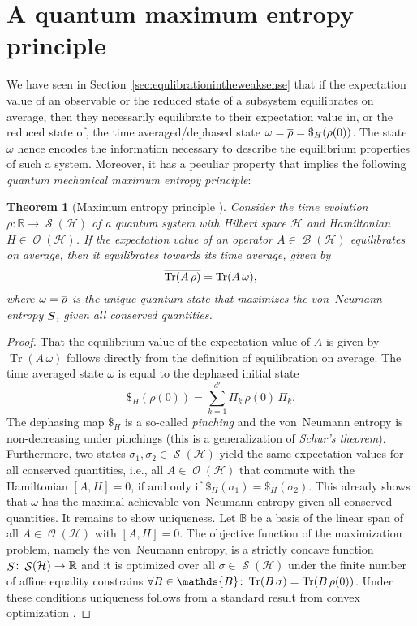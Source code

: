 \documentclass[a4paper,12pt,listof=totoc,index=totoc,bibliography=totoc,headsepline=false,headings=normal,BCOR16.153846mm,DIV12,headinclude,twoside,cleardoublepage=empty,numbers=noenddot,final]{scrreprt}
\theoremstyle{mystyle}
\numberwithin{equation}{section}
\numberwithin{figure}{section}
\numberwithin{lemma}{section}
\newtheorem{theorem}{Theorem}
\numberwithin{theorem}{section}
\numberwithin{corollary}{section}
\numberwithin{definition}{section}
\numberwithin{conjecture}{section}
\numberwithin{observation}{section}
\newcommand{\+}{\mkern2mu}
\newcommand{\oftype}{\colon}
\newcommand{\itholds}{\colon\mathchoice{\quad}{}{}{}}
\renewcommand{\H}{H}
\newcommand{\Basis}{\mathds{B}}
\newcommand{\taverage}[2][]{
  \ifthenelse{\equal{#1}{}}
  {\overline{#2}}
  {\overline{#2}^{#1}}
}
\DeclareMathOperator{\1}{\mathds{1}}
\DeclareMathOperator{\Bop}{\mathcal{B}}
\DeclareMathOperator{\Obs}{\mathcal{O}}
\DeclareMathOperator{\Qst}{\mathcal{S}}
\DeclareMathOperator{\Svn}{\mathnormal{S}}
\DeclareMathOperator{\Tr}{Tr}
\newcommand{\mc}[1]{\mathcal{#1}}
\newcommand{\mcH}{\mc{H}}
\newcommand{\mb}[1]{\mathbb{#1}}
\newcommand{\R}{\mb{R}}
\begin{document}
\section{A quantum maximum entropy principle}
\label{sec:aquantummaximumentropyprinciple}
%
We have seen in Section~\ref{sec:equlibrationintheweaksense} that if the expectation value of an observable or the reduced state of a subsystem equilibrates on average, then they necessarily equilibrate to their expectation value in, or the reduced state of, the time averaged/dephased state $\omega = \taverage{\rho} = \$_\H(\rho(0))$.
The state $\omega$ hence encodes the information necessary to describe the equilibrium properties of such a system.
Moreover, it has a peculiar property that implies the following \emph{quantum mechanical maximum entropy principle}:

\begin{theorem}[Maximum entropy principle \cite{PhysRevLett.10-6}] \label{thm:maximumentropyprinciple}
  Consider the time evolution $\rho\oftype\R\to\Qst(\mcH)$ of a quantum system with Hilbert space $\mcH$ and Hamiltonian $\H \in \Obs(\mcH)$.
  If the expectation value of an operator $A \in \Bop(\mcH)$ equilibrates on average, then it equilibrates towards its time average, given by
  \begin{equation}
    \taverage{\Tr(A\,\rho)} = \Tr(A\,\omega) ,
  \end{equation}
  where $\omega = \taverage{\rho}$ is the unique quantum state that maximizes the von~Neumann entropy $\Svn$, given all conserved quantities.
\end{theorem}
\begin{proof}
  That the equilibrium value of the expectation value of $A$ is given by $\Tr(A\,\omega)$ follows directly from the definition of equilibration on average.
  The time averaged state $\omega$ is equal to the dephased initial state 
  \begin{equation}
    \$_H(\rho(0)) = \sum_{k=1}^{d'} \Pi_k\,\rho(0)\,\Pi_k .
  \end{equation}
  The dephasing map $\$_\H$ is a so-called \emph{pinching} and the von~Neumann entropy is non-decreasing under pinchings \cite[Problem II.5.5]{bhatia} (this is a generalization of \emph{Schur's theorem}).
  Furthermore, two states $\sigma_1,\sigma_2 \in \Qst(\mcH)$ yield the same expectation values for all conserved quantities, i.e., all $A \in\Obs(\mcH)$ that commute with the Hamiltonian $[A,\H] = 0$, if and only if $\$_\H(\sigma_1) = \$_\H(\sigma_2)$.
  This already shows that $\omega$ has the maximal achievable von~Neumann entropy given all conserved quantities.
  It remains to show uniqueness.
  Let $\Basis$ be a basis of the linear span of all $A \in\Obs(\mcH)$ with $[A,\H] = 0$.
  The objective function of the maximization problem, namely the von~Neumann entropy, is a strictly concave function $\Svn\oftype\Qst(\mcH) \to \R$ and it is optimized over all $\sigma \in \Qst(\mcH)$ under the finite number of affine equality constrains $\forall B \in \Basis \itholds \Tr(B\,\sigma) = \Tr(B\,\rho(0))$.
  Under these conditions uniqueness follows from a standard result from convex optimization \cite{Boyd2004}.
\end{proof}
\end{document}

